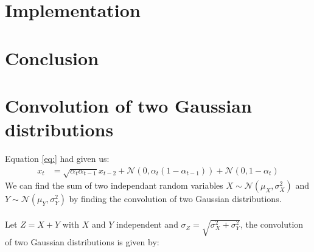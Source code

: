 \documentclass{article}
\begin{document}
\newpage
\section{Implementation}

\newpage
\section{Conclusion}

\newpage
\appendix
\section{Convolution of two Gaussian distributions}
Equation \ref{eq:} had given us:
\begin{align*}
  x_t &= \sqrt{\alpha_t \alpha_{t-1}} x_{t-2} + \mathcal{N}\left(0, \alpha_t\left(1 - \alpha_{t-1}\right)\right) + \mathcal{N}\left(0, 1 - \alpha_t\right)
\end{align*}
We can find the sum of two independant random variables $X \sim \mathcal{N}\left(\mu_X, \sigma_X^2\right)$ and $Y \sim \mathcal{N}\left(\mu_Y, \sigma_Y^2\right)$ by finding the convolution of two Gaussian distributions.
\\\\
Let $Z = X + Y$ with $X$ and $Y$ independent and $\sigma_Z = \sqrt{\sigma_X^2 + \sigma_Y^2}$, the convolution of two Gaussian distributions is given by:
\end{document}
